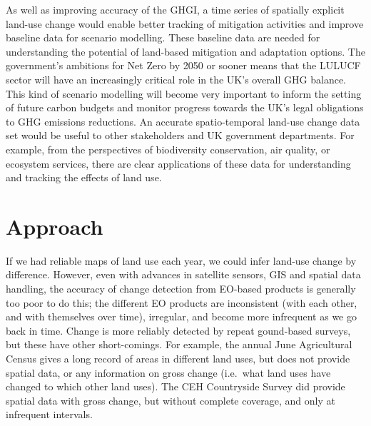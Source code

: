 \documentclass[
]{book}
\begin{document}
As well as improving accuracy of the GHGI, a time series of spatially explicit land-use change would enable better tracking of mitigation activities and improve baseline data for scenario modelling. These baseline data are needed for understanding the potential of land-based mitigation and adaptation options. The government's ambitions for Net Zero by 2050 or sooner means that the LULUCF sector will have an increasingly critical role in the UK's overall GHG balance. This kind of scenario modelling will become very important to inform the setting of future carbon budgets and monitor progress towards the UK's legal obligations to GHG emissions reductions. An accurate spatio-temporal land-use change data set would be useful to other stakeholders and UK government departments. For example, from the perspectives of biodiversity conservation, air quality, or ecosystem services, there are clear applications of these data for understanding and tracking the effects of land use.

\hypertarget{approach}{%
\section{Approach}\label{approach}}

If we had reliable maps of land use each year, we could infer land-use change by difference. However, even with advances in satellite sensors, GIS and spatial data handling, the accuracy of change detection from EO-based products is generally too poor to do this; the different EO products are inconsistent (with each other, and with themselves over time), irregular, and become more infrequent as we go back in time.
Change is more reliably detected by repeat gound-based surveys, but these have other short-comings. For example, the annual June Agricultural Census gives a long record of areas in different land uses, but does not provide spatial data, or any information on gross change (i.e.~what land uses have changed to which other land uses). The CEH Countryside Survey did provide spatial data with gross change, but without complete coverage, and only at infrequent intervals.
\end{document}
